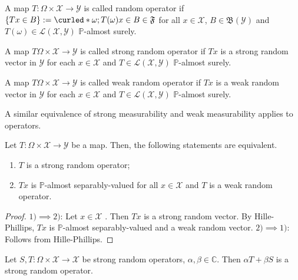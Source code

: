 \begin{defn}
  A map \( T: \Omega \times \mathcal{X} \to \mathcal{Y} \) is called random operator if \( \{Tx \in B\}:= \curled*{\omega ;T(\omega)x \in B}\in \mathfrak{F} \) for all \( x \in \mathcal{X}\), \( B\in \mathfrak{B}(\mathcal{Y}) \) and \( T(\omega) \in \mathcal{L}(\mathcal{X},\mathcal{Y})\) \( \mathbb{P} \)-almost surely.
\end{defn}


\begin{defn}
    A map \(  T \Omega \times \mathcal{X} \to \mathcal{Y} \) is called strong random operator if \( Tx \) is a strong random vector in \( \mathcal{Y} \) for each \( x \in \mathcal{X} \) and \( T \in \mathcal{L}(\mathcal{X},\mathcal{Y}) \) \( \mathbb{P} \)-almost surely.
\end{defn}


\begin{defn}
    A map \(  T \Omega \times \mathcal{X} \to \mathcal{Y} \) is called weak random operator if \( Tx \) is a weak random vector in \( \mathcal{Y} \) for each \( x \in \mathcal{X} \) and \( T\in \mathcal{L}(\mathcal{X},\mathcal{Y}) \) \( \mathbb{P} \)-almost surely.
\end{defn}


A similar equivalence of strong measurability and weak measurability applies to operators.


\begin{thm}[]
    Let \( T: \Omega \times \mathcal{X} \to \mathcal{Y} \) be a map. Then, the following statements are equivalent.
    \begin{enumerate}[1)]
      \item \( T \) is a strong random operator;
      \item \( Tx \) is \( \mathbb{P} \)-almost separably-valued for all \( x \in \mathcal{X} \) and \( T \) is a weak random operator.
    \end{enumerate}
    
\end{thm}

\begin{proof}
    \( 1) \implies 2) \): Let \( x \in \mathcal{X} \) . Then \( Tx \) is a strong random vector. By Hille-Phillips, \( Tx \) is \( \mathbb{P} \)-almost separably-valued and a weak random vector. 
    \( 2) \implies 1) \): Follows from Hille-Phillips.
\end{proof}


\begin{corl}
    Let \( S,T :\Omega \times \mathcal{X} \to \mathcal{X} \) be strong random operators, \( \alpha,\beta \in \mathbb{C} \). Then \( \alpha T+\beta S \) is a strong random operator.    
\end{corl}

